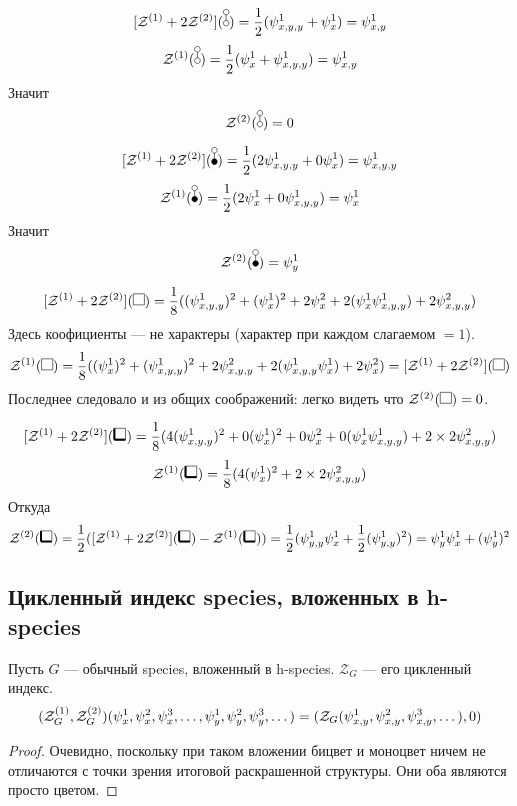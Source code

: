 \begin{example}
$$
\Zfull(\dA) = \frac{1}{2}(\psi_{x,y,y}^1 + \psi_{x}^1) = \psi_{x,y}^1
$$
$$
\Zone(\dA) = \frac{1}{2}(\psi_{x}^1 + \psi_{x, y, y}^1) = \psi_{x,y}^1
$$
Значит
$$
\Ztwo(\dA) = 0
$$
\end{example}
\begin{example}
$$
\Zfull(\dB) = \frac{1}{2}(2\psi_{x,y,y}^1 + 0\psi_{x}^1) = \psi_{x,y,y}^1
$$
$$
\Zone(\dB) = \frac{1}{2}(2\psi_{x}^1 + 0\psi_{x, y, y}^1) = \psi_{x}^1
$$
Значит
$$
\Ztwo(\dB) = \psi_{y}^1
$$
\end{example}
\begin{example}
$$
\Zfull(\dAA) = \frac{1}{8}((\psi_{x,y,y}^1)^2 + (\psi_{x}^1)^2 + 2\psi_{x}^2 +
2(\psi_x^1\psi_{x,y,y}^1) + 2\psi_{x,y,y}^2)
$$
Здесь коофициенты --- не характеры (характер при каждом слагаемом $= 1$).
$$
\Zone(\dAA) = \frac{1}{8}((\psi_{x}^1)^2 + (\psi_{x, y, y}^1)^2 +
2\psi_{x, y, y}^2 + 2(\psi_{x, y, y}^1\psi_{x}^1) + 2\psi_{x}^2) = \Zfull(\dAA)
$$
Последнее следовало и из общих соображений: легко видеть что $\mathcal
Z^{(2)}(\dAA) = 0$.
\end{example}
\begin{example}
$$
\Zfull(\dBB) = \frac{1}{8}(4(\psi_{x,y,y}^1)^2 + 0(\psi_{x}^1)^2 + 0\psi_{x}^2
+ 0(\psi_x^1\psi_{x,y,y}^1) + 2\times2\psi_{x,y,y}^2)
$$
$$
\Zone(\dBB) = \frac{1}{8}(4(\psi_{x}^1)^2 + 2\times2\psi_{x,y,y}^2)
$$
Откуда
$$
\Ztwo(\dBB) = \frac{1}{2}(\Zfull(\dBB) - \mathcal
Z^{(1)}(\dBB)) = \frac{1}{2}(\psi_{y,y}^1\psi_{x}^1 +
\frac{1}{2}(\psi_{y, y}^1)^2) = \psi_{y}^1\psi_{x}^1 + (\psi_{y}^1)^2 $$
\end{example}

\subsection{Цикленный индекс species, вложенных в h-species}
\begin{statement}
\label{st:h-cl-for-sp}
Пусть $G$ --- обычный species, вложенный в h-species. $\mathcal Z_G$ --- его
цикленный индекс.
$$(\mathcal Z^{(1)}_G, \mathcal Z^{(2)}_G)
(\psi_x^1, \psi_x^2, \psi_x^3, \dots, 
\psi_y^1, \psi_y^2, \psi_y^3, \dots)
 = (\mathcal Z_G(\psi_{x,y}^1, \psi_{x,y}^2, \psi_{x,y}^3, \dots), 0)$$
\end{statement}
\begin{proof}
Очевидно, поскольку при таком вложении бицвет и моноцвет ничем не отличаются с
точки зрения итоговой раскрашенной структуры. Они оба являются просто цветом.
\end{proof}

